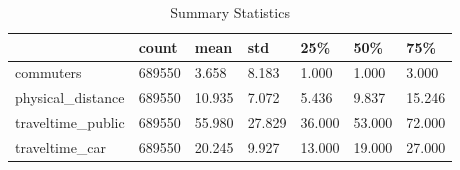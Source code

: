 \begin{table}
\caption{Summary Statistics}
\label{tab:summary_stats}
\begin{tabular}{lllllll}
\toprule
 & count & mean & std & 25\% & 50\% & 75\% \\
\midrule
commuters & 689550 & 3.658 & 8.183 & 1.000 & 1.000 & 3.000 \\
physical\_distance & 689550 & 10.935 & 7.072 & 5.436 & 9.837 & 15.246 \\
traveltime\_public & 689550 & 55.980 & 27.829 & 36.000 & 53.000 & 72.000 \\
traveltime\_car & 689550 & 20.245 & 9.927 & 13.000 & 19.000 & 27.000 \\
\bottomrule
\end{tabular}
\end{table}
